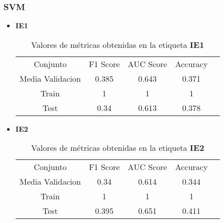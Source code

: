 \subsubsection*{SVM}
\begin{itemize}
	\item \textbf{IE1}
	      \begin{table}[H]
		      \centering
		      \begin{tabular}{|c|c|c|c|c}
			      \cline{1-4}
			      Conjunto         & F1 Score & AUC Score & Accuracy \\ \cline{1-4}
			      Media Validacion & 0.385    & 0.643     & 0.371    \\ \cline{1-4}
			      Train            & 1        & 1         & 1        \\ \cline{1-4}
			      Test             & 0.34     & 0.613     & 0.378    \\ \cline{1-4}
		      \end{tabular}
		      \caption{Valores de métricas obtenidas en la etiqueta \textbf{IE1}}
	      \end{table}
	\item  \textbf{IE2}
	      \begin{table}[H]
		      \centering
		      \begin{tabular}{|c|c|c|c|c}
			      \cline{1-4}
			      Conjunto         & F1 Score & AUC Score & Accuracy \\ \cline{1-4}
			      Media Validacion & 0.34     & 0.614     & 0.344    \\ \cline{1-4}
			      Train            & 1        & 1         & 1        \\ \cline{1-4}
			      Test             & 0.395    & 0.651     & 0.411    \\ \cline{1-4}
		      \end{tabular}
		      \caption{Valores de métricas obtenidas en la etiqueta \textbf{IE2}}
	      \end{table}


\end{itemize}
